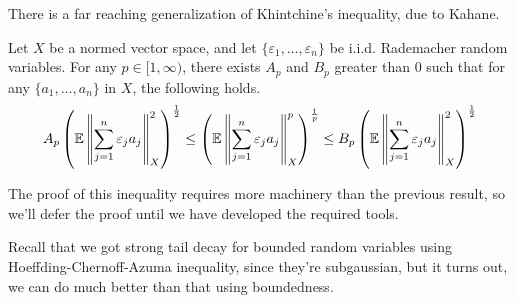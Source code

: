 \documentclass[11pt]{article}
\begin{document}
There is a far reaching generalization of Khintchine's inequality, due to Kahane.
\begin{theorem}
  Let $X$ be a normed vector space, and let $\{\varepsilon_1, \ldots, \varepsilon_n\}$ be i.i.d. Rademacher random variables.
  For any $p \in [1, \infty)$, there exists $A_p$ and $B_p$ greater than $0$ such that for any $\{a_1, \ldots, a_n\}$ in $X$, the following holds.
  \begin{align*}
    A_p \left( \mathbb{E} \left\lVert\sum_{j=1}^n \varepsilon_j a_j\right\rVert^2_X \right)^{\frac{1}{2}} \leq \left( \mathbb{E} \left\lVert\sum_{j=1}^n \varepsilon_j a_j\right\rVert^p_X \right)^{\frac{1}{p}} \leq B_p \left( \mathbb{E} \left\lVert\sum_{j=1}^n \varepsilon_j a_j\right\rVert^2_X \right)^{\frac{1}{2}}
  \end{align*}
\end{theorem}
The proof of this inequality requires more machinery than the previous result, so we'll defer the proof until we have developed the required tools.

Recall that we got strong tail decay for bounded random variables using Hoeffding-Chernoff-Azuma inequality, since they're subgaussian, but it turns out, we can do much better than that using boundedness.
\end{document}
